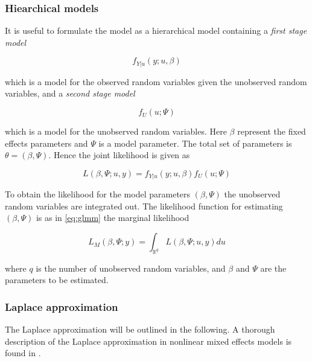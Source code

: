 \documentclass[preprint, 3p, authoryear]{elsarticle} %
\begin{document}
\hypertarget{hiearchical-models}{%
\subsubsection{Hiearchical models}\label{hiearchical-models}}

It is useful to formulate the model as a hierarchical model containing a \emph{first stage model}

\begin{equation}\label{eq:firstStage}
  f_{Y|u}(y;u,\beta)
\end{equation}

which is a model for the observed random variables given the unobserved random variables, and a \emph{second stage model}

\begin{equation}\label{eq:secondStage}
  f_{U}(u; \Psi)
\end{equation}

which is a model for the unobserved random variables. Here \(\beta\) represent the fixed effects parameters and \(\Psi\) is a model parameter. The total set of parameters is \(\theta=(\beta, \Psi)\). Hence the joint likelihood is given as

\begin{equation}\label{eq:jl}
  L(\beta, \Psi; u, y)=f_{Y|u}(y;u,\beta) f_{U}(u; \Psi)
\end{equation}

To obtain the likelihood for the model parameters \((\beta, \Psi)\) the unobserved random variables are integrated out. The likelihood function for estimating \((\beta, \Psi)\) is as in \eqref{eq:glmm} the marginal likelihood

\begin{equation}\label{eq:glmm2}
  L_{M}(\beta, \Psi; y)=\int_{\mathbb{R}^{q}} L(\beta, \Psi;u,y) du
\end{equation}

where \(q\) is the number of unobserved random variables, and \(\beta\) and \(\Psi\) are the parameters to be estimated.

\hypertarget{laplace-approximation}{%
\subsubsection{Laplace approximation}\label{laplace-approximation}}

The Laplace approximation will be outlined in the following. A thorough description of the Laplace approximation in nonlinear mixed effects models is found in \citet{Wolfinger_1997}.
\end{document}
